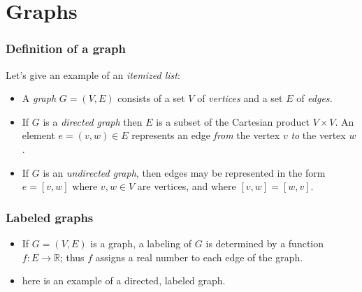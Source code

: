 \documentclass{beamer}
\theoremstyle{remark}
\begin{document}
\section{Graphs}
\begin{frame}
  \frametitle{Definition of a graph} 
  Let's give an example of an \emph{itemized list}: \pause
  \begin{itemize}
  \item A \emph{graph} \(G = (V,E)\) consists of a set \(V\) of \emph{vertices} and a set \(E\)
    of \emph{edges.}
    \pause
  \item If \(G\) is a \emph{directed graph} then \(E\) is a subset of
    the Cartesian product \(V \times V\). An element \(e = (v,w) \in E\)
    represents an edge \emph{from} the vertex \(v\) \emph{to} the
    vertex \(w\).  \pause
  \item If \(G\) is an \emph{undirected graph}, then edges may be
    represented in the form \(e = [v,w]\) where \(v,w \in V\) are
    vertices, and where \([v,w] = [w,v]\).
  \end{itemize} 
  
\end{frame}

\begin{frame}
  \frametitle{Labeled graphs} 

  \begin{itemize}
  \item If \(G = (V,E)\) is a graph, a labeling of \(G\) is determined by a function
    \(f:E \to \mathbb{R}\); thus \(f\) assigns a real number to each edge of the graph.
    \pause
  \item here is an example of a directed, labeled graph.

    \vfil
    \begin{center}
    \end{center}
    
  \end{itemize}
  
\end{frame}
\end{document}

